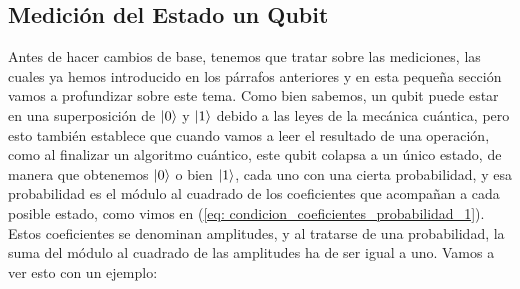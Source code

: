 \documentclass[12pt]{article}
\numberwithin{equation}{section} %
\begin{document}
    \vspace{10mm}

    \subsection{Medición del Estado un Qubit}

    \vspace{5mm}

    Antes de hacer cambios de base, tenemos que tratar sobre las mediciones, las cuales ya hemos introducido en los párrafos anteriores y en esta pequeña sección vamos a profundizar sobre este tema. Como bien sabemos, un qubit puede estar en una superposición de \( \ket{0} \) y \( \ket{1} \) debido a las leyes de la mecánica cuántica, pero esto también establece que cuando vamos a leer el resultado de una operación, como al finalizar un algoritmo cuántico, este qubit colapsa a un único estado, de manera que obtenemos \( \ket{0} \) o bien \( \ket{1} \), cada uno con una cierta probabilidad, y esa probabilidad es el módulo al cuadrado de los coeficientes que acompañan a cada posible estado, como vimos en (\ref{eq: condicion_coeficientes_probabilidad_1}). Estos coeficientes se denominan amplitudes, y al tratarse de una probabilidad, la suma del módulo al cuadrado de las amplitudes ha de ser igual a uno. Vamos a ver esto con un ejemplo:

    \vspace{5mm}
\end{document}
